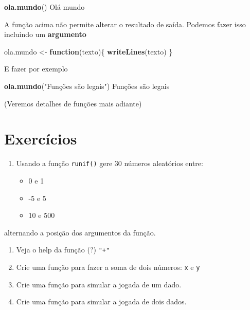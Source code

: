 \documentclass[10pt,a4paper]{book}
\newenvironment{Shaded}{\begin{snugshade}}{\end{snugshade}}
\newcommand{\KeywordTok}[1]{\textcolor[rgb]{0.13,0.29,0.53}{\textbf{#1}}}
\newcommand{\StringTok}[1]{\textcolor[rgb]{0.31,0.60,0.02}{#1}}
\newcommand{\ControlFlowTok}[1]{\textcolor[rgb]{0.13,0.29,0.53}{\textbf{#1}}}
\newcommand{\NormalTok}[1]{#1}
\providecommand{\tightlist}{%
  \setlength{\itemsep}{0pt}\setlength{\parskip}{0pt}}
\begin{document}
\begin{Shaded}
\begin{Highlighting}[]
\KeywordTok{ola.mundo}\NormalTok{()}
\NormalTok{Olá mundo}
\end{Highlighting}
\end{Shaded}

A função acima não permite alterar o resultado de saída. Podemos fazer
isso incluindo um \textbf{argumento}

\begin{Shaded}
\begin{Highlighting}[]
\NormalTok{ola.mundo <-}\StringTok{ }\ControlFlowTok{function}\NormalTok{(texto)\{}
    \KeywordTok{writeLines}\NormalTok{(texto)}
\NormalTok{\}}
\end{Highlighting}
\end{Shaded}

E fazer por exemplo

\begin{Shaded}
\begin{Highlighting}[]
\KeywordTok{ola.mundo}\NormalTok{(}\StringTok{"Funções são legais"}\NormalTok{)}
\NormalTok{Funções são legais}
\end{Highlighting}
\end{Shaded}

(Veremos detalhes de funções mais adiante)

\section*{Exercícios}\label{exercicios-1}


\begin{enumerate}
\def\labelenumi{\arabic{enumi}.}
\tightlist
\item
  Usando a função \texttt{runif()} gere \(30\) números aleatórios entre:

  \begin{itemize}
  \tightlist
  \item
    0 e 1
  \item
    -5 e 5
  \item
    10 e 500
  \end{itemize}
\end{enumerate}

alternando a posição dos argumentos da função.

\begin{enumerate}
\def\labelenumi{\arabic{enumi}.}
\setcounter{enumi}{1}
\tightlist
\item
  Veja o help da função (?) \texttt{"+"}
\item
  Crie uma função para fazer a soma de dois números: \texttt{x} e
  \texttt{y}
\item
  Crie uma função para simular a jogada de um dado.
\item
  Crie uma função para simular a jogada de dois dados.
\end{enumerate}
\end{document}
